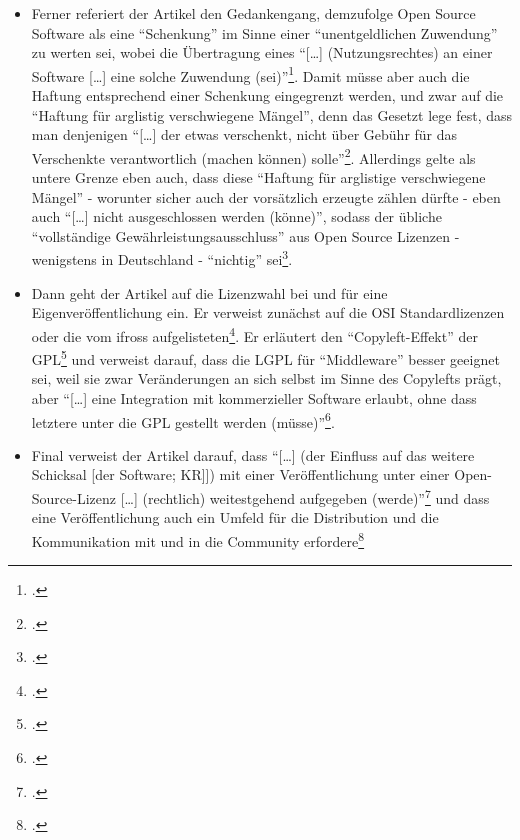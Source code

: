 \documentclass[DIV=calc,BCOR=5mm,11pt,headings=small,oneside,abstract=true, toc=bib]{scrartcl}
\begin{document}
\begin{itemize}
  Autor eine gesonderte umfassende Vereinbarung abschließen müssen, sofern sie
  selbst diese Software als Open Source veröffentlichen
  wollen\footcite[vgl.][175f]{BreGlaGra2008a}
  \item Ferner referiert der Artikel den Gedankengang, demzufolge Open Source
  Software als eine \enquote{Schenkung} im Sinne einer
  \enquote{unentgeldlichen Zuwendung} zu werten sei, wobei die Übertragung
  eines \enquote{[\ldots] (Nutzungsrechtes) an einer Software [\ldots] eine
  solche Zuwendung (sei)}\footcite[vgl.][177]{BreGlaGra2008a}. Damit müsse
  aber auch die Haftung entsprechend einer Schenkung eingegrenzt werden, und
  zwar auf die \enquote{Haftung für arglistig verschwiegene Mängel}, denn
  das Gesetzt lege fest, dass man denjenigen \enquote{[\ldots] der
  etwas verschenkt, nicht über Gebühr für das Verschenkte verantwortlich
  (machen können) solle}\footcite[vgl.][177]{BreGlaGra2008a}. Allerdings
  gelte als untere Grenze eben auch, dass diese \enquote{Haftung für
  arglistige verschwiegene Mängel} - worunter sicher auch der vorsätzlich
  erzeugte zählen dürfte - eben auch \enquote{[\ldots] nicht ausgeschlossen
  werden (könne)}, sodass
  der übliche \enquote{vollständige Gewährleistungsausschluss} aus Open
  Source Lizenzen - wenigstens in Deutschland - \enquote{nichtig}
  sei\footcite[vgl.][177]{BreGlaGra2008a}.
  \item Dann geht der Artikel auf die Lizenzwahl bei und für eine
  Eigenveröffentlichung ein. Er verweist zunächst auf die OSI Standardlizenzen
  oder die vom ifross aufgelisteten\footcite[vgl.][179]{BreGlaGra2008a}. Er
  erläutert den \enquote{Copyleft-Effekt} der
  GPL\footcite[vgl.][180]{BreGlaGra2008a} und verweist darauf, dass die LGPL für
  \enquote{Middleware} besser geeignet sei, weil sie zwar Veränderungen an
  sich selbst im Sinne des Copylefts prägt, aber \enquote{[\ldots] eine
  Integration mit kommerzieller Software erlaubt, ohne dass letztere
  unter die GPL gestellt werden
  (müsse)}\footcite[vgl.][181]{BreGlaGra2008a}. 
  \item Final verweist der Artikel darauf, dass \enquote{[\ldots] (der Einfluss
  auf das weitere Schicksal [der Software; KR]]) mit einer Veröffentlichung
  unter einer Open-Source-Lizenz [\ldots] (rechtlich) weitestgehend
  aufgegeben (werde)}\footcite[vgl.][183]{BreGlaGra2008a} und dass
  eine Veröffentlichung auch ein Umfeld für die Distribution und die
  Kommunikation mit und in die Community
  erfordere\footcite[vgl.][185f]{BreGlaGra2008a}

\end{itemize}
\end{document}
